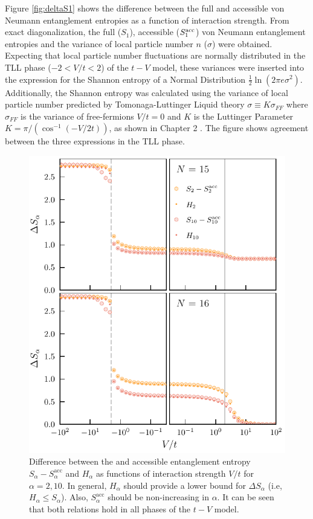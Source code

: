 %
Figure \ref{fig:deltaS1} shows the difference between the full and accessible von Neumann entanglement entropies as a function of interaction strength. From exact diagonalization, the full ($S_1$), accessible ($S_{1}^{\rm acc}$) von Neumann entanglement entropies and the variance of local particle number $n$ ($\sigma$) were obtained. Expecting that local particle number fluctuations are normally distributed in the TLL phase ($-2 < V/t < 2$) of the $t-V$ model, these variances were inserted into the expression for the Shannon entropy of a Normal Distribution $\frac{1}{2}\ln{\left( 2\pi e \sigma^2 \right)}$. Additionally, the Shannon entropy was calculated using the variance of local particle number predicted by Tomonaga-Luttinger Liquid theory $\sigma \equiv K\sigma_{FF}$ where $\sigma_{FF}$ is the variance of free-fermions $V/t = 0$ and $K$ is the Luttinger Parameter $K = \pi/(\cos^{-1}\left( -V/2t \right))$, as shown in Chapter 2 . The figure shows agreement between the three expressions in the TLL phase.


\begin{figure}[h!]
\begin{center}
\includegraphics[scale=1.0]{higherAlphaDeltaS_N15N16.pdf}
\end{center}
\caption{Difference between the \ren and accessible entanglement entropy $S_{\alpha} - S_{\alpha}^{\mathrm{acc}}$ and $H_{\alpha}$ as functions of interaction strength $V/t$ for $\alpha=2,10$. In general, $H_{\alpha}$ should provide a lower bound for $\Delta S_{\alpha}$ (i.e, $H_{\alpha} \leq S_{\alpha}$). Also, $S_{\alpha}^{\mathrm{acc}}$ should be non-increasing in $\alpha$. It can be seen that both relations hold in all phases of the $t-V$ model.}
\label{fig:deltaS_alpha}
\end{figure}

